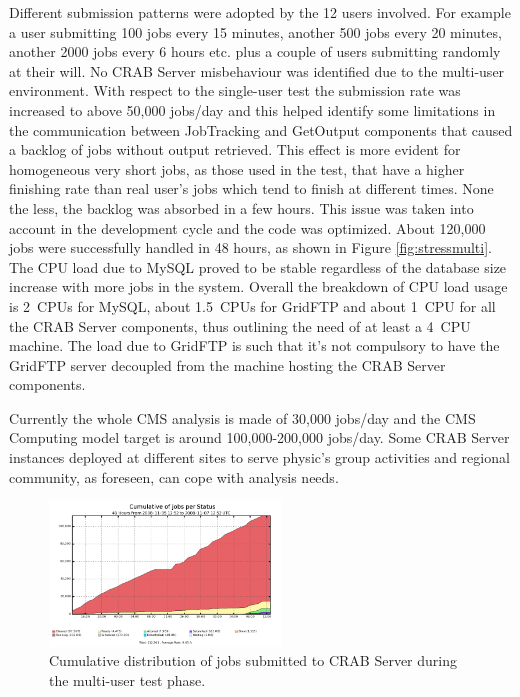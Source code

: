 \begin{itemize}
Different submission patterns were adopted by the 12 users
involved. For example a user submitting 100 jobs every 15 minutes,
another 500 jobs every 20 minutes, another 2000 jobs every 6 hours
etc. plus a couple of users submitting randomly at their will.  No
CRAB Server misbehaviour was identified due to the multi-user
environment. With respect to the single-user test the submission rate
was increased to above 50,000 jobs/day and this helped identify some
limitations in the communication between JobTracking and GetOutput
components that caused a backlog of jobs without output
retrieved. This effect is more evident for homogeneous very short
jobs, as those used in the test, that have a higher finishing rate
than real user's jobs which tend to finish at different times. None
the less, the backlog was absorbed in a few hours. This issue was
taken into account in the development cycle and the code was
optimized.  About 120,000 jobs were successfully handled in 48 hours,
as shown in Figure \ref{fig:stressmulti}.  The CPU load due to MySQL
proved to be stable regardless of the database size increase with more
jobs in the system. Overall the breakdown of CPU load usage is 2~CPUs
for MySQL, about 1.5~CPUs for GridFTP and about 1~CPU for all the CRAB
Server components, thus outlining the need of at least a 4~CPU
machine.  The load due to GridFTP is such that it's not compulsory to
have the GridFTP server decoupled from the machine hosting the CRAB
Server components.

Currently the whole CMS analysis is made of 30,000 jobs/day and the
CMS Computing model target is around 100,000-200,000 jobs/day. Some
CRAB Server instances deployed at different sites to serve physic's
group activities and regional community, as foreseen, can cope with
analysis needs.
\end{itemize}
\begin{figure}
\centering
\includegraphics[width=0.55\textwidth]{figures/MultiUserJobStatus.png}
\caption{Cumulative distribution of jobs submitted to CRAB Server
  during the multi-user test phase. }
\label{stressmulti}
\end{figure}



